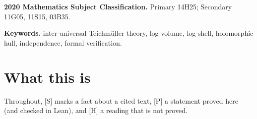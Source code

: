 \documentclass[11pt]{article}
\theoremstyle{plain}
\theoremstyle{definition}
\theoremstyle{remark}
\newcommand{\Smark}{\textup{[S]}}
\newcommand{\Pmark}{\textup{[P]}}
\newcommand{\Hmark}{\textup{[H]}}
\begin{document}
\begin{abstract}
\cite[\S4]{Form} corresponds to that intersection. The conclusion does follow if the images of the $\Theta$-pilot and the
$q$-pilot are identified, but then the degree scale of the $\Theta$-link is $1$. Negative
results of this kind were proved before, for abstractions of the passage \cite{Higuchi,Pajo}
and in Lean \cite{Takkun,lana}; the public repository lana-agents/iut of Project LANA proves
non-derivability from a package collecting what it proves at the level of
\cite[Thm.~3.11]{IUT3} and separates two readings of (SHE) \cite{lana}. The results here
were obtained independently of these Lean works, which were made public first. What this
note adds is that the axioms are the results that the proof actually cites, at the strength
of the source, and that the models are built on actual local objects. All statements proved here
are checked in Lean~4 with Mathlib, with no axioms beyond the standard three.
\emph{We do not claim that \cite[Cor.~3.12]{IUT3} is false, nor anything about $abc$.
The result concerns what follows from the statements that the proof cites, including
what \cite[Thm.~3.11]{IUT3} states about the output of its algorithm; whether the
construction of the algorithm itself supplies the missing membership is not decided
here.}
\end{abstract}

\medskip
\noindent\textbf{2020 Mathematics Subject Classification.} Primary 14H25;
Secondary 11G05, 11S15, 03B35.

\noindent\textbf{Keywords.} inter-universal Teichm\"uller theory, log-volume, log-shell,
holomorphic hull, independence, formal verification.

\section{What this is}\label{s:what}

Throughout, \Smark{} marks a fact about a cited text, \Pmark{} a statement proved here
(and checked in Lean), and \Hmark{} a reading that is not proved.
\end{document}
